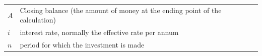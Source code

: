 \begin{itemize}[noitemsep]
{\begin{tabular}[t]{|l|l|}
     \tabularnewline\cline{1-1}\cline{2-2}
                  $A$
                 &
        Closing balance (the amount of money at the ending point of the calculation)%
     \tabularnewline\cline{1-1}\cline{2-2}
                  $i$
                 &
        interest rate, normally the effective rate per annum%
     \tabularnewline\cline{1-1}\cline{2-2}
                  $n$
                 &
        period for which the investment is made%
     \tabularnewline\cline{1-1}\cline{2-2}
    \end{tabular}} %
        \addtolength{\mytableboxheight}{\mytableboxdepth}
\end{itemize}
